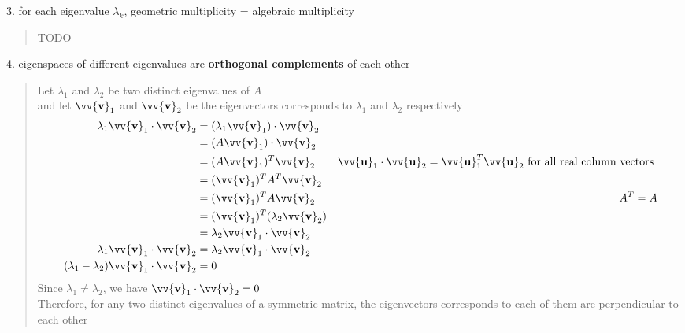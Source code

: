 \documentclass[11pt]{article}
\DeclareRobustCommand{\myvec}[1]{\vv{\mathbf{#1}}}
\newcommand{\mymat}[1]{#1}
\newcommand{\dotprod}[2]{#1 \cdot #2}
\begin{document}
    \noindent
    \begin{minipage}{\textwidth}
        3. for each eigenvalue $\lambda_k$, geometric multiplicity = algebraic multiplicity
        \begin{quote}
            TODO
        \end{quote}
    \end{minipage} 
    \vspace{2ex}

    \noindent
    \begin{minipage}{\textwidth}
        4. eigenspaces of different eigenvalues are \textbf{orthogonal complements} of each other
        \begin{quote}
            Let $\lambda_1$ and $\lambda_2$ be two distinct eigenvalues of $\mymat{A}$ \\
            and let $\myvec{v}_1$ and $\myvec{v}_2$ be the eigenvectors corresponds to $\lambda_1$ and $\lambda_2$ respectively
            \begin{align*}
                \lambda_1 \dotprod{\myvec{v}_1}{\myvec{v}_2} &= \dotprod{(\lambda_1 \myvec{v}_1)}{\myvec{v}_2} \\
                &= \dotprod{(\mymat{A} \myvec{v}_1)}{\myvec{v}_2} \\
                &= (\mymat{A} \myvec{v}_1)^T \myvec{v}_2 & \dotprod{\myvec{u}_1}{\myvec{u}_2} = \myvec{u}_1^T \myvec{u}_2 \text{ for all real column vectors } \\
                &= (\myvec{v}_1)^T \mymat{A}^T \myvec{v}_2 \\
                &= (\myvec{v}_1)^T \mymat{A} \myvec{v}_2 & \mymat{A}^T = \mymat{A}\\
                &= (\myvec{v}_1)^T (\lambda_2 \myvec{v}_2) \\
                &= \lambda_2 \dotprod{\myvec{v}_1}{\myvec{v}_2} \\
                \lambda_1 \dotprod{\myvec{v}_1}{\myvec{v}_2} &= \lambda_2 \dotprod{\myvec{v}_1}{\myvec{v}_2} \\
                (\lambda_1 - \lambda_2) \dotprod{\myvec{v}_1}{\myvec{v}_2} &= 0 
            \end{align*}
            Since $\lambda_1 \ne \lambda_2$, we have $\dotprod{\myvec{v}_1}{\myvec{v}_2} = 0$ \\ 
            Therefore, for any two distinct eigenvalues of a symmetric matrix, the eigenvectors corresponds to each of them are perpendicular to each other
        \end{quote}
    \end{minipage}
\end{document}
